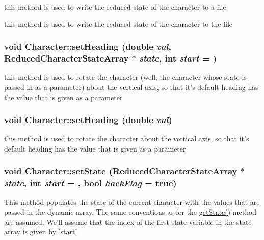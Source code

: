 \label{classCartWheel_1_1Core_1_1Character_a9b5120d9522efa88fb44c0582e5aabd8}
this method is used to write the reduced state of the character to a file

this method is used to write the reduced state of the character to the file \hypertarget{classCartWheel_1_1Core_1_1Character_af68429bd47e8f545ae958fec490eeea8}{
\subsubsection[{setHeading}]{\setlength{\rightskip}{0pt plus 5cm}void Character::setHeading (double {\em val}, \/  {\bf ReducedCharacterStateArray} $\ast$ {\em state}, \/  int {\em start} = {})}}
\label{classCartWheel_1_1Core_1_1Character_af68429bd47e8f545ae958fec490eeea8}
this method is used to rotate the character (well, the character whose state is passed in as a parameter) about the vertical axis, so that it's default heading has the value that is given as a parameter \hypertarget{classCartWheel_1_1Core_1_1Character_a7d4dcfcc3d50dc91602a7eb9b99a1643}{
\subsubsection[{setHeading}]{\setlength{\rightskip}{0pt plus 5cm}void Character::setHeading (double {\em val})}}
\label{classCartWheel_1_1Core_1_1Character_a7d4dcfcc3d50dc91602a7eb9b99a1643}
this method is used to rotate the character about the vertical axis, so that it's default heading has the value that is given as a parameter \hypertarget{classCartWheel_1_1Core_1_1Character_a03c2f7a1318a2f6c5e6d1cafbdcf288a}{
\subsubsection[{setState}]{\setlength{\rightskip}{0pt plus 5cm}void Character::setState ({\bf ReducedCharacterStateArray} $\ast$ {\em state}, \/  int {\em start} = {}, \/  bool {\em hackFlag} = {\ttfamily true})}}
\label{classCartWheel_1_1Core_1_1Character_a03c2f7a1318a2f6c5e6d1cafbdcf288a}
This method populates the state of the current character with the values that are passed in the dynamic array. The same conventions as for the \hyperlink{classCartWheel_1_1Core_1_1Character_a690c7d5b7d36bdb1997558ab42bdc917}{getState()} method are assumed. We'll assume that the index of the first state variable in the state array is given by 'start'.

